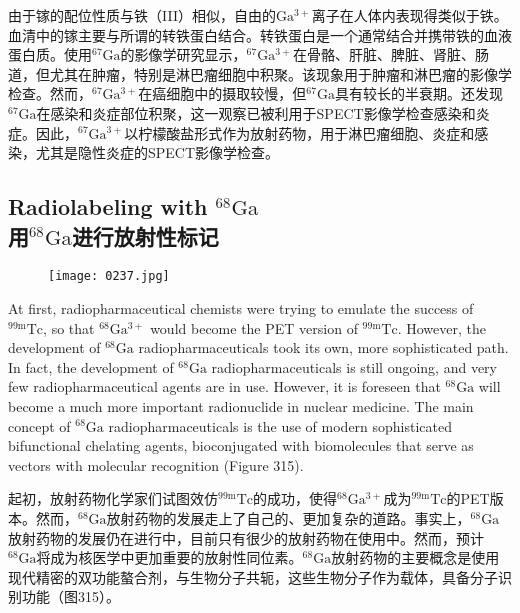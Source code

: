 \documentclass[dvipsnames, svgnames,a4paper,11pt]{article}
\begin{document}
由于镓的配位性质与铁（III）相似，自由的\(\mathrm{Ga^{3+}}\)离子在人体内表现得类似于铁。血清中的镓主要与所谓的转铁蛋白结合。转铁蛋白是一个通常结合并携带铁的血液蛋白质。使用\(\mathrm{^{67}Ga}\)的影像学研究显示，\(\mathrm{^{67}Ga^{3+}}\)在骨骼、肝脏、脾脏、肾脏、肠道，但尤其在肿瘤，特别是淋巴瘤细胞中积聚。该现象用于肿瘤和淋巴瘤的影像学检查。然而，\(\mathrm{^{67}Ga^{3+}}\)在癌细胞中的摄取较慢，但\(\mathrm{^{67}Ga}\)具有较长的半衰期。还发现\(\mathrm{^{67}Ga}\)在感染和炎症部位积聚，这一观察已被利用于SPECT影像学检查感染和炎症。因此，\(\mathrm{^{67}Ga^{3+}}\)以柠檬酸盐形式作为放射药物，用于淋巴瘤细胞、炎症和感染，尤其是隐性炎症的SPECT影像学检查。

\subsection{Radiolabeling with \(\mathrm{^{68}Ga}\)\\ 用\(\mathrm{^{68}Ga}\)进行放射性标记}  
\begin{figure}[h]
	\centering
    \texttt{[image: 0237.jpg]}  
     \label{fig315}
\end{figure}

At first, radiopharmaceutical chemists were trying to emulate the success of \(\mathrm{^{99m}Tc}\), so that \(\mathrm{^{68}Ga^{3+}}\) would become the PET version of \(\mathrm{^{99m}Tc}\). However, the development of \(\mathrm{^{68}Ga}\) radiopharmaceuticals took its own, more sophisticated path. In fact, the development of \(\mathrm{^{68}Ga}\) radiopharmaceuticals is still ongoing, and very few radiopharmaceutical agents are in use. However, it is foreseen that \(\mathrm{^{68}Ga}\) will become a much more important radionuclide in nuclear medicine. The main concept of \(\mathrm{^{68}Ga}\) radiopharmaceuticals is the use of modern sophisticated bifunctional chelating agents, bioconjugated with biomolecules that serve as vectors with molecular recognition (Figure 315).

起初，放射药物化学家们试图效仿\(\mathrm{^{99m}Tc}\)的成功，使得\(\mathrm{^{68}Ga^{3+}}\)成为\(\mathrm{^{99m}Tc}\)的PET版本。然而，\(\mathrm{^{68}Ga}\)放射药物的发展走上了自己的、更加复杂的道路。事实上，\(\mathrm{^{68}Ga}\)放射药物的发展仍在进行中，目前只有很少的放射药物在使用中。然而，预计\(\mathrm{^{68}Ga}\)将成为核医学中更加重要的放射性同位素。\(\mathrm{^{68}Ga}\)放射药物的主要概念是使用现代精密的双功能螯合剂，与生物分子共轭，这些生物分子作为载体，具备分子识别功能（图315）。
\end{document}
